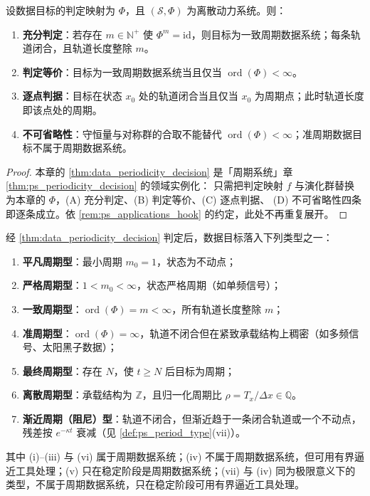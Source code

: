 \begin{theorem}[数据周期性判定定理]\label{thm:data_periodicity_decision}
设数据目标的判定映射为 $\Phi$，且 $(\mathcal S,\Phi)$ 为离散动力系统。则：
\begin{enumerate}[label=(\Alph*)]
    \item \textbf{充分判定}：若存在 $m\in\mathbb N^+$ 使 $\Phi^m=\mathrm{id}$，则目标为一致周期数据系统；每条轨道闭合，且轨道长度整除 $m$。
    \item \textbf{判定等价}：目标为一致周期数据系统当且仅当 $\operatorname{ord}(\Phi)<\infty$。
    \item \textbf{逐点判据}：目标在状态 $x_0$ 处的轨道闭合当且仅当 $x_0$ 为周期点；此时轨道长度即该点处的周期。
    \item \textbf{不可省略性}：守恒量与对称群的合取不能替代 $\operatorname{ord}(\Phi)<\infty$；准周期数据目标不属于周期数据系统。
\end{enumerate}
\end{theorem}

\begin{proof}
本章的 \cref{thm:data_periodicity_decision} 是「周期系统」章 \cref{thm:ps_periodicity_decision} 的领域实例化：
只需把判定映射 $f$ 与演化群替换为本章的 $\Phi$，(A) 充分判定、(B) 判定等价、(C) 逐点判据、
(D) 不可省略性四条即逐条成立。依 \cref{rem:ps_applications_hook} 的约定，此处不再重复展开。
\end{proof}

\begin{corollary}[数据周期类型]\label{cor:data_period_type}
经 \cref{thm:data_periodicity_decision} 判定后，数据目标落入下列类型之一：
\begin{enumerate}[label=(\roman*)]
    \item \textbf{平凡周期型}：最小周期 $m_0=1$，状态为不动点；
    \item \textbf{严格周期型}：$1<m_0<\infty$，状态严格周期（如单频信号）；
    \item \textbf{一致周期型}：$\operatorname{ord}(\Phi)=m<\infty$，所有轨道长度整除 $m$；
    \item \textbf{准周期型}：$\operatorname{ord}(\Phi)=\infty$，轨道不闭合但在紧致承载结构上稠密（如多频信号、太阳黑子数据）；
    \item \textbf{最终周期型}：存在 $N$，使 $t\ge N$ 后目标为周期；
    \item \textbf{离散周期型}：承载结构为 $\mathbb Z$，且归一化周期比 $\rho=T_x/\Delta x\in\mathbb Q$。
    \item \textbf{渐近周期（阻尼）型}：轨道不闭合，但渐近趋于一条闭合轨道或一个不动点，残差按 $e^{-\kappa t}$ 衰减（见 \cref{def:ps_period_type}(vii)）。
\end{enumerate}
其中 (i)--(iii) 与 (vi) 属于周期数据系统；(iv) 不属于周期数据系统，但可用有界逼近工具处理；(v) 只在稳定阶段是周期数据系统；(vii) 与 (iv) 同为极限意义下的类型，不属于周期数据系统，只在稳定阶段可用有界逼近工具处理。
\end{corollary}

